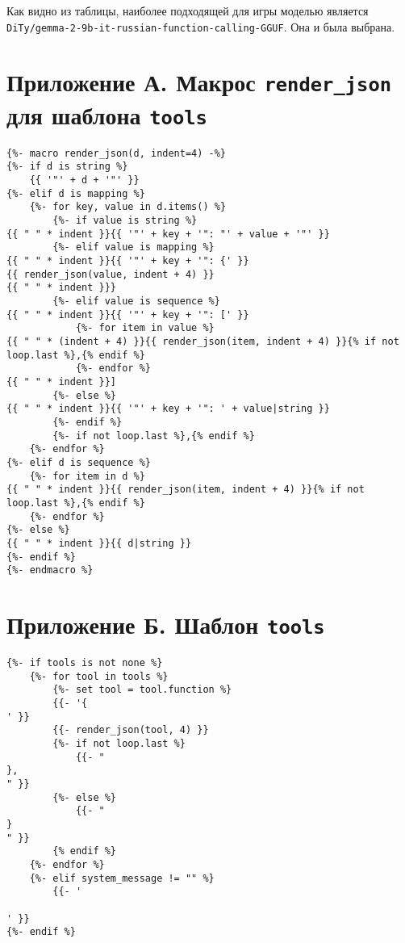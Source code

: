 \documentclass[14pt]{extarticle}
\begin{document}
Как видно из таблицы, наиболее подходящей для игры моделью является \texttt{DiTy/gemma-2-9b-it-russian-function-calling-GGUF}. Она и была выбрана.

\section{Приложение А. Макрос \texttt{render\_json} для шаблона \texttt{tools}}
\begin{verbatim}
{%- macro render_json(d, indent=4) -%}
{%- if d is string %}
    {{ '"' + d + '"' }}
{%- elif d is mapping %}
    {%- for key, value in d.items() %}
        {%- if value is string %}
{{ " " * indent }}{{ '"' + key + '": "' + value + '"' }}
        {%- elif value is mapping %}
{{ " " * indent }}{{ '"' + key + '": {' }}
{{ render_json(value, indent + 4) }}
{{ " " * indent }}}
        {%- elif value is sequence %}
{{ " " * indent }}{{ '"' + key + '": [' }}
            {%- for item in value %}
{{ " " * (indent + 4) }}{{ render_json(item, indent + 4) }}{% if not loop.last %},{% endif %}
            {%- endfor %}
{{ " " * indent }}]
        {%- else %}
{{ " " * indent }}{{ '"' + key + '": ' + value|string }}
        {%- endif %}
        {%- if not loop.last %},{% endif %}
    {%- endfor %}
{%- elif d is sequence %}
    {%- for item in d %}
{{ " " * indent }}{{ render_json(item, indent + 4) }}{% if not loop.last %},{% endif %}
    {%- endfor %}
{%- else %}
{{ " " * indent }}{{ d|string }}
{%- endif %}
{%- endmacro %}
\end{verbatim}
\section{Приложение Б. Шаблон \texttt{tools}}
\begin{verbatim}
{%- if tools is not none %}
    {%- for tool in tools %}
        {%- set tool = tool.function %}
        {{- '{
' }}
        {{- render_json(tool, 4) }}
        {%- if not loop.last %}
            {{- "
},
" }}
        {%- else %}
            {{- "
}
" }}
        {% endif %}
    {%- endfor %}
    {%- elif system_message != "" %}
        {{- '

' }}
{%- endif %}
\end{verbatim}
\newpage
\newpage
\end{document}
